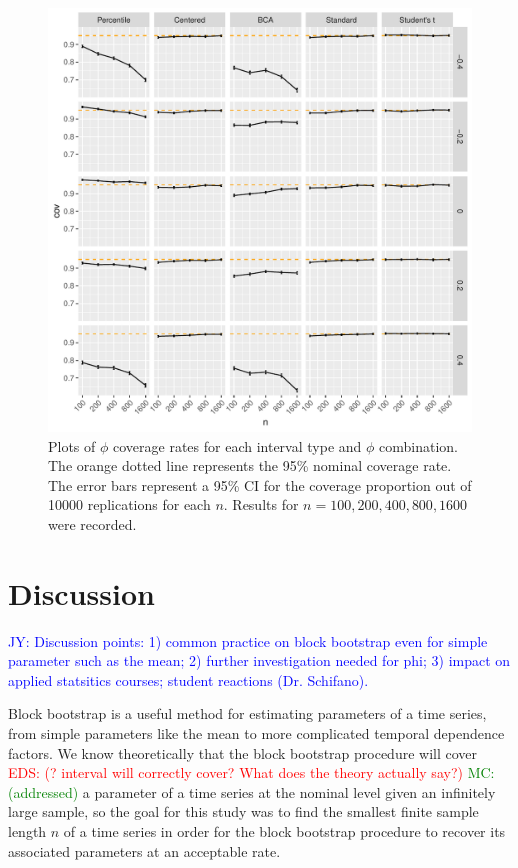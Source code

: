 \documentclass[12pt, letterpaper, titlepage]{article}
\newcommand{\jy}[1]{\textcolor{blue}{JY: #1}}
\newcommand{\eds}[1]{\textcolor{red}{EDS: (#1)}}
\newcommand{\mc}[1]{\textcolor{green}{MC: (#1)}}
\begin{document}
\begin{figure}[tbp]
  \centering
  \includegraphics[width=\textwidth]{figures/plot_phi}
  \caption{Plots of $\phi$ coverage rates for each interval type and $\phi$
    combination. The orange dotted line represents the 95\% nominal coverage
    rate. The error bars represent a 95\% CI for the coverage
    proportion out of 10000 replications for each $n$. Results for 
    $n = 100, 200, 400, 800, 1600$ were recorded.}
  \label{fig:phi}
\end{figure}




\section{Discussion}
\label{sec:disc}

\jy{Discussion points:
  1) common practice on block bootstrap even for simple parameter such as the
  mean;
  2) further investigation needed for phi;
  3) impact on applied statsitics courses; student reactions (Dr. Schifano).
}


Block bootstrap is a useful method for estimating parameters of a time
series, from simple parameters like the mean to more complicated temporal
 dependence factors.
 We know theoretically that the block bootstrap procedure will cover
 \eds{? interval will correctly cover?  What does the theory  actually say?}
 \mc{addressed} a
 parameter of a time series at the nominal level given an
 infinitely large
sample, so the goal for this study was to find the smallest finite
sample length $n$ of a time series in order for the block bootstrap procedure
to 
recover its associated parameters at an acceptable rate.
\end{document}
